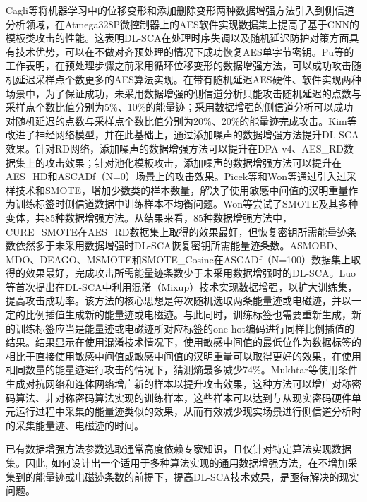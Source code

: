 {	Cagli等\citep{Cagli17}将机器学习中的位移变形和添加删除变形两种数据增强方法引入到侧信道分析领域，在Atmega328P微控制器上的AES软件实现数据集上提高了基于CNN的模板类攻击的性能。这表明DL-SCA在处理时序失调以及随机延迟防护对策方面具有技术优势，可以在不做对齐预处理的情况下成功恢复AES单字节密钥。Pu等\citep{Pu17}的工作表明，在预处理步骤之前采用循环位移变形的数据增强方法，可以成功攻击随机延迟采样点个数更多的AES算法实现。在带有随机延迟AES硬件、软件实现两种场景中，为了保证成功，未采用数据增强的侧信道分析只能攻击随机延迟的点数与采样点个数比值分别为5\%、10\%的能量迹；采用数据增强的侧信道分析可以成功对随机延迟的点数与采样点个数比值分别为20\%、20\%的能量迹完成攻击。Kim等\citep{Kim19}改进了神经网络模型，并在此基础上，通过添加噪声的数据增强方法提升DL-SCA效果。针对RD网络，添加噪声的数据增强方法可以提升在DPA v4、AES\_RD数据集上的攻击效果；针对池化模板攻击，添加噪声的数据增强方法可以提升在AES\_HD和ASCADf（N=0）场景上的攻击效果。Picek等\citep{Picek19}和Won等\citep{Won20}通过引入过采样技术和SMOTE，增加少数类的样本数量，解决了使用敏感中间值的汉明重量作为训练标签时侧信道数据中训练样本不均衡问题。Won等\citep{Won20}尝试了SMOTE及其多种变体，共85种数据增强方法\citep{Kovcs19}。从结果来看，85种数据增强方法中，CURE\_SMOTE在AES\_RD数据集上取得的效果最好，但恢复密钥所需能量迹条数依然多于未采用数据增强时DL-SCA恢复密钥所需能量迹条数。ASMOBD、MDO、DEAGO、MSMOTE和SMOTE\_Cosine在ASCADf（N=100）数据集上取得的效果最好，完成攻击所需能量迹条数少于未采用数据增强时的DL-SCA\chenggongtiaoshu 。Luo等\citep{Luo21}首次提出在DL-SCA中利用混淆（Mixup）技术实现数据增强，以扩大训练集，提高攻击成功率。该方法的核心思想是每次随机选取两条能量迹或电磁迹，并以一定的比例插值生成新的能量迹或电磁迹。与此同时，训练标签也需要重新生成，新的训练标签应当是能量迹或电磁迹所对应标签的one-hot编码进行同样比例插值的结果。结果显示在使用混淆技术情况下，使用敏感中间值的最低位作为数据标签的相比于直接使用敏感中间值或敏感中间值的汉明重量可以取得更好的效果，在使用相同数量的能量迹进行攻击的情况下，猜测熵最多减少74\%。Mukhtar等\citep{Mukhtar22}使用条件生成对抗网络和连体网络增广新的样本以提升攻击效果，这种方法可以增广对称密码算法、非对称密码算法实现的训练样本，这些样本可以达到与从现实密码硬件单元运行过程中采集的能量迹类似的效果，从而有效减少现实场景进行侧信道分析时的采集能量迹、电磁迹的时间。
	
	已有数据增强方法参数选取通常高度依赖专家知识，且仅针对特定算法实现数据集。因此, 如何设计出一个适用于多种算法实现的通用数据增强方法，在不增加采集到的能量迹或电磁迹条数的前提下，提高DL-SCA技术效果，是亟待解决的现实问题。
	
}
